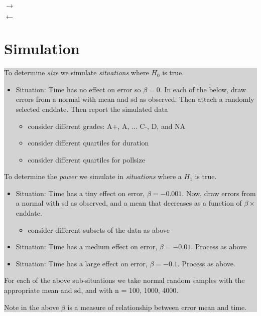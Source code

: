 \documentclass[10pt, oneside]{article}
\newcommand \diabox[2]{\colorbox{lightgray}{\parbox{#1}{#2}}}
\begin{document}
\hfill
\begin{minipage}[t]{1cm}

\vskip 2in

\Huge$\rightarrow$

\vskip 2in

$\leftarrow$\normalsize

\end{minipage}
\hfill
\begin{minipage}[t]{8cm}

\section*{Simulation}
\diabox{8cm}{
To determine \emph{size} we simulate \emph{situations} where $H_0$ is true. 

\begin{itemize}
\item Situation: Time has no effect on error so $\beta = 0$. In each of the below, draw errors from a normal with mean and sd as observed. Then attach a randomly selected enddate. Then report the simulated data

\begin{itemize}
\item consider different grades: A+, A, ... C-, D, and NA

\item consider different quartiles for duration

\item consider different quartiles for pollsize
\end{itemize}

\end{itemize}

To determine the \emph{power} we simulate in \emph{situations} where a $H_1$ is true. 

\begin{itemize}
\item Situation: Time has a tiny effect on error, $\beta = -0.001$. Now, draw errors from a normal with sd as observed, and a mean that decreases as a function of $\beta \times$enddate. 

\begin{itemize}
\item consider different subsets of the data as above
\end{itemize}

\item Situation: Time has a medium effect on error, $\beta = -0.01$. Process as above

\item Situation: Time has a large effect on error, $\beta = -0.1$. Process as above. 

\end{itemize}

For each of the above sub-situations we take normal random samples with the appropriate mean and sd, and with n = 100, 1000, 4000. 

Note in the above $\beta$ is a measure of relationship between error mean and time.

}
\end{minipage}
\end{document}
